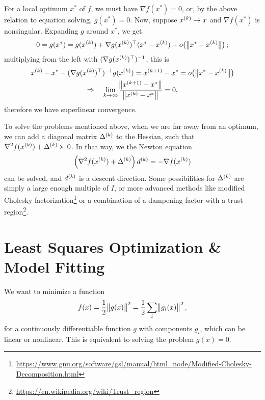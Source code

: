 \documentclass{article}
\begin{document}

For a local optimum \(x^*\) of \(f\), we must have \(\nabla f(x^*) = 0\), or, by the above relation
to equation solving, \(g(x^*) = 0\).  Now, suppose \(x^{(k)} \to x\) and \(\nabla f(x^*)\) is
nonsingular.  Expanding \(g\) around \(x^*\), we get
\begin{equation*}
  0 = g(x^*) = g(\kth{x}) + \T{\nabla g(\kth{x})} (x^* - \kth{x}) + o\!\del[1]{\,\enVert[1]{x^* - \kth{x}}};
\end{equation*}
multiplying from the left with \((\nabla g(x^{(k)})^{\top})^{-1}\), this is
\begin{gather*}
  \kth{x} - x^* - (\T{\nabla g(\kth{x})})^{-1} g(\kth{x}) = \kth[k+1]{x} - x^* = o\!\del[1]{\,\enVert[1]{x^* - \kth{x}}} \\
  \Rightarrow \quad \lim_{k \to \infty} \frac{\enVert[1]{\kth[k+1]{x} - x^*}}{\enVert[1]{\kth{x} - x^*}} = 0,
\end{gather*}
therefore we have superlinear convergence.



To solve the problems mentioned above, when we are far away from an optimum, we can add a diagonal
matrix \(\Delta^{(k)}\) to the Hessian, such that \(\nabla^2 f(x^{(k)}) + \Delta^{(k)} \succ 0\).
In that way, we the Newton equation
\begin{equation*}
  \left( \nabla^2 f(x^{(k)}) + \Delta^{(k)} \right) d^{(k)} = -\nabla f(x^{(k)})
\end{equation*}
can be solved, and \(d^{(k)}\) is a descent direction.  Some possibilities for \(\Delta^{(k)}\) are
simply a large enough multiple of \(I\), or more advanced methods like modified Cholesky
factorization\footnote{\url{https://www.gnu.org/software/gsl/manual/html_node/Modified-Cholesky-Decomposition.html}}
or a combination of a dampening factor with a trust
region\footnote{\url{https://en.wikipedia.org/wiki/Trust_region}}.


\section{Least Squares Optimization \& Model Fitting}


We want to minimize a function
\begin{equation*}
  f(x) = \frac{1}{2} \enVert[1]{g(x)}^2 = \frac{1}{2} \sum_i \enVert[1]{g_i(x)}^2,
\end{equation*}
for a continuously differentiable function \(g\) with components \(g_i\), which can be linear or
nonlinear.  This is equivalent to solving the problem \(g(x) = 0\).
\end{document}
